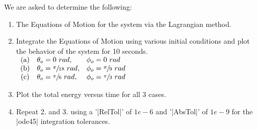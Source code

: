 \documentclass[12pt]{report}
\begin{document}
\begin{flushleft}
We are asked to determine the following: \\
\begin{enumerate}
  \item The Equations of Motion for the system via the Lagrangian method.
  \item Integrate the Equations of Motion using various initial conditions and plot
  the behavior of the system for 10 seconds. \\
  \vspace{2ex}
  $
  \begin{array}{cll}
    \text{(a)} & \theta_o = 0~rad, & \phi_o = 0~rad \\
    \text{(b)} & \theta_o = \sfrac{\pi}{18}~rad, & \phi_o = \sfrac{\pi}{9}~rad \\
    \text{(c)} & \theta_o = \sfrac{\pi}{6}~rad, & \phi_o = \sfrac{\pi}{3}~rad \\
  \end{array}
  $
  \item Plot the total energy versus time for all 3 cases.
  \item Repeat 2. and 3. using a '|RelTol|' of $1e-6$ and '|AbsTol|' of $1e-9$ for the
  |ode45| integration tolerances.
\end{enumerate}
\newpage

\end{flushleft}
\end{document}
